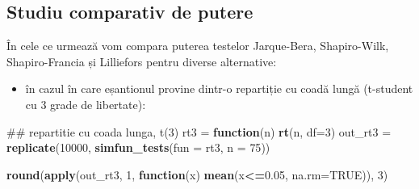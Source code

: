 \documentclass[]{article}
\newenvironment{Shaded}{\begin{snugshade}}{\end{snugshade}}
\newcommand{\KeywordTok}[1]{\textcolor[rgb]{0.13,0.29,0.53}{\textbf{#1}}}
\newcommand{\DataTypeTok}[1]{\textcolor[rgb]{0.13,0.29,0.53}{#1}}
\newcommand{\DecValTok}[1]{\textcolor[rgb]{0.00,0.00,0.81}{#1}}
\newcommand{\FloatTok}[1]{\textcolor[rgb]{0.00,0.00,0.81}{#1}}
\newcommand{\StringTok}[1]{\textcolor[rgb]{0.31,0.60,0.02}{#1}}
\newcommand{\OtherTok}[1]{\textcolor[rgb]{0.56,0.35,0.01}{#1}}
\newcommand{\ControlFlowTok}[1]{\textcolor[rgb]{0.13,0.29,0.53}{\textbf{#1}}}
\newcommand{\OperatorTok}[1]{\textcolor[rgb]{0.81,0.36,0.00}{\textbf{#1}}}
\newcommand{\NormalTok}[1]{#1}
\providecommand{\tightlist}{%
  \setlength{\itemsep}{0pt}\setlength{\parskip}{0pt}}
\begin{document}
\subsection{Studiu comparativ de
putere}\label{studiu-comparativ-de-putere}

În cele ce urmează vom compara puterea testelor Jarque-Bera,
Shapiro-Wilk, Shapiro-Francia și Lilliefors pentru diverse alternative:

\begin{Shaded}
\end{Shaded}

\begin{itemize}
\tightlist
\item
  în cazul în care eșantionul provine dintr-o repartiție cu coadă lungă
  (t-student cu 3 grade de libertate):
\end{itemize}

\begin{Shaded}
\begin{Highlighting}[]
\NormalTok{## repartitie cu coada lunga, t(3)}
\NormalTok{rt3 =}\StringTok{ }\ControlFlowTok{function}\NormalTok{(n) }\KeywordTok{rt}\NormalTok{(n, }\DataTypeTok{df=}\DecValTok{3}\NormalTok{)}
\NormalTok{out_rt3 =}\StringTok{ }\KeywordTok{replicate}\NormalTok{(}\DecValTok{10000}\NormalTok{, }\KeywordTok{simfun_tests}\NormalTok{(}\DataTypeTok{fun =}\NormalTok{ rt3, }\DataTypeTok{n =} \DecValTok{75}\NormalTok{))}

\KeywordTok{round}\NormalTok{(}\KeywordTok{apply}\NormalTok{(out_rt3, }\DecValTok{1}\NormalTok{, }\ControlFlowTok{function}\NormalTok{(x) }\KeywordTok{mean}\NormalTok{(x}\OperatorTok{<=}\FloatTok{0.05}\NormalTok{, }\DataTypeTok{na.rm=}\OtherTok{TRUE}\NormalTok{)), }\DecValTok{3}\NormalTok{)}
\end{Highlighting}
\end{Shaded}
\end{document}
